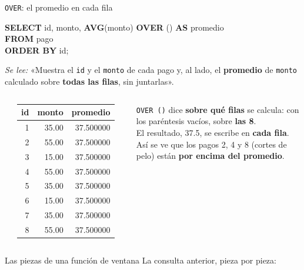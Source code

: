 \documentclass[aspectratio=169,10pt,c]{beamer}
\newcommand{\kw}[1]{\textcolor{utpRojo}{\textbf{#1}}}
\newcommand{\gris}[1]{\textcolor{utpGris}{#1}}
\newcommand{\dentro}[1]{{\setlength{\fboxsep}{1.5pt}\colorbox{yellow!45}{#1}}}
\newcommand{\fila}{\rowcolor{yellow!45}}
\newenvironment{sqlcode}[1][.86\textwidth]
  {\begin{center}\begin{lrbox}{\sqlbuf}\begin{minipage}{#1}\ttfamily\footnotesize\vspace{6pt}\raggedright}
  {\vspace{6pt}\end{minipage}\end{lrbox}\colorbox{utpGrisClaro}{\usebox{\sqlbuf}}\end{center}}
\newcommand{\piezax}{7.6}
\newcommand{\pieza}[3]{%
  \node[pieza] at (0,#1) {#2};
  \node[para] at (\piezax,#1) {\textcolor{utpRojo}{$\blacktriangleleft$}\ #3};}
\newcommand{\cab}[1]{\normalfont\bfseries #1}
\newcommand{\res}[3]{%
  \centering{\scriptsize\color{utpGris}resultado}\\[3pt]
  \footnotesize\ttfamily
  \begin{tabular}{#1}
  \toprule
  #2 \\
  \midrule
  #3
  \bottomrule
  \end{tabular}}
\begin{document}
\begin{frame}{\texttt{OVER}: el promedio en cada fila}
\renewcommand{\arraystretch}{0.82}
\begin{sqlcode}[.75\textwidth]
\kw{SELECT} id, monto, \dentro{\kw{AVG}(monto) \kw{OVER} ()} \kw{AS} promedio\\
\kw{FROM} pago\\
\kw{ORDER BY} id;
\end{sqlcode}
\vspace{-0.15cm}
{\centering\small\textit{Se lee:} «Muestra el \texttt{id} y el \texttt{monto} de cada pago y, al lado, el \textbf{promedio} de \texttt{monto} calculado sobre \textbf{todas las filas}, sin juntarlas».\par}
\vspace{0.05cm}
\begin{columns}[c,onlytextwidth]
\centering
\res{rrr}{\cab{id} & \cab{monto} & \cab{promedio}}{1 & 35.00 & 37.500000 \\ \fila 2 & 55.00 & 37.500000 \\ 3 & 15.00 & 37.500000 \\ \fila 4 & 55.00 & 37.500000 \\ 5 & 35.00 & 37.500000 \\ 6 & 15.00 & 37.500000 \\ 7 & 35.00 & 37.500000 \\ \fila 8 & 55.00 & 37.500000 \\}
\raggedright\small
\texttt{OVER ()} dice \textbf{sobre qué filas} se calcula: con los paréntesis vacíos, sobre \textbf{las 8}.\\[6pt]
El resultado, 37.5, se escribe en \textbf{cada fila}. Así se ve que los pagos 2, 4 y 8 (cortes de pelo) están \textbf{por encima del promedio}.
\end{columns}
\vspace{0.05cm}
\end{frame}
\begin{frame}{Las piezas de una función de ventana}
\small La consulta anterior, pieza por pieza:
\vspace{0.3cm}
\begin{center}
\renewcommand{\piezax}{4.2}
\end{center}
\vspace{0.3cm}
\end{frame}
\end{document}
